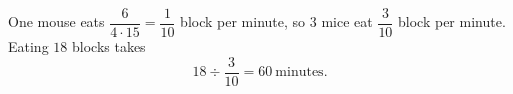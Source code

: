 One mouse eats $\dfrac{6}{4\cdot15}=\dfrac{1}{10}$ block per minute, so $3$ mice eat $\dfrac{3}{10}$ block per minute. Eating $18$ blocks takes
\[18\div\dfrac{3}{10}=\boxed{60}\ \text{minutes}.\]
